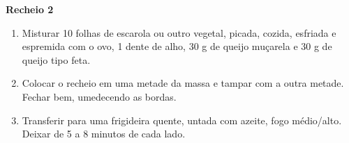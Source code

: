 {  \textbf{Recheio 2}
  \begin{enumerate}
  \item Misturar 10 folhas de escarola ou outro vegetal, picada, cozida, esfriada e espremida com o ovo, 1
    dente de alho, 30 g de queijo muçarela e 30 g de queijo tipo feta.
  \item Colocar o recheio em uma metade da massa e tampar com a outra metade. Fechar bem, umedecendo as
    bordas.
  \item Transferir para uma frigideira quente, untada com azeite, fogo médio/alto. Deixar de 5 a 8 minutos de
    cada lado.
  \end{enumerate}
}